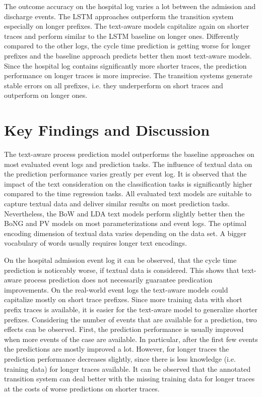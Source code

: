 The outcome accuracy on the hospital log varies a lot between the admission and discharge events.
The LSTM approaches outperform the transition system especially on longer prefixes.
The text-aware models capitalize again on shorter traces and perform similar to the LSTM baseline on longer ones.
Differently compared to the other logs, the cycle time prediction is getting worse for longer prefixes and the baseline approach predicts better then most text-aware models.
Since the hospital log contains significantly more shorter traces, the prediction performance on longer traces is more imprecise.
The transition systems generate stable errors on all prefixes, i.e. they underperform on short traces and outperform on longer ones.
 

\section{Key Findings and Discussion}

The text-aware process prediction model outperforms the baseline approaches on most evaluated event logs and prediction tasks.
The influence of textual data on the prediction performance varies greatly per event log.
It is observed that the impact of the text consideration on the classification tasks is significantly higher compared to the time regression tasks.
All evaluated text models are suitable to capture textual data and deliver similar results on most prediction tasks.
Nevertheless, the BoW and LDA text models perform slightly better then the BoNG and PV models on most parameterizations and event logs.
The optimal encoding dimension of textual data varies depending on the data set.
A bigger vocabulary of words usually requires longer text encodings.

On the hospital admission event log it can be observed, that the cycle time prediction is noticeably worse, if textual data is considered.
This shows that text-aware process prediction does not necessarily guarantee predication improvements.
On the real-world event logs the text-aware models could capitalize mostly on short trace prefixes.
Since more training data with short prefix traces is available, it is easier for the text-aware model to generalize shorter prefixes.
Considering the number of events that are available for a prediction, two effects can be observed.
First, the prediction performance is usually improved when more events of the case are available.
In particular, after the first few events the predictions are mostly improved a lot.
However, for longer traces the prediction performance decreases slightly, since there is less knowledge (i.e. training data) for longer traces available.
It can be observed that the annotated transition system can deal better with the missing training data for longer traces at the costs of worse predictions on shorter traces.

